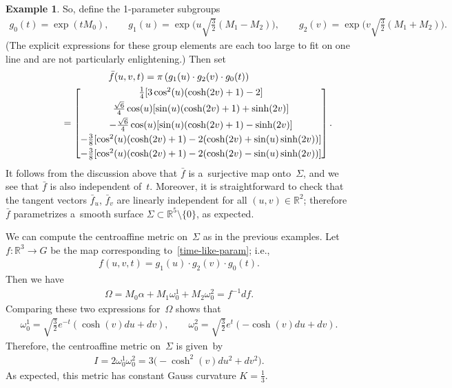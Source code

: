 \documentclass[pdftex]{sigma}
\numberwithin{equation}{section}
\theoremstyle{definition}
\newtheorem{exmpl}[teo]{Example}
\begin{document}
\begin{exmpl}
So, def\/ine the 1-parameter subgroups
\begin{gather*}
g_0(t) = \exp(tM_0),
\qquad\! \!
g_1(u) = \exp\Big(u \sqrt{\tfrac{3}{2}} (M_1 - M_2)\Big),
\qquad\! \!
g_2(v) = \exp\Big(v \sqrt{\tfrac{3}{2}} (M_1 + M_2)\Big).
\end{gather*}
(The explicit expressions for these group elements are each too large to f\/it on one line and are not particularly
enlightening.) Then set
\begin{gather}
\bar{f}(u,v,t)=\pi\left(g_1(u) \cdot g_2(v) \cdot g_0(t) \right)
\nonumber
\\
\phantom{\bar{f}(u,v,t)}
  =
\begin{bmatrix}
\frac{1}{4}[3 \cos^2(u)(\cosh(2v) + 1) - 2]
\vspace{1mm}\\
\frac{\sqrt{6}}{4} \cos(u) [\sin(u)(\cosh(2v) + 1) + \sinh(2v)]
\vspace{1mm}\\
-\frac{\sqrt{6}}{4} \cos(u) [\sin(u)(\cosh(2v) + 1) - \sinh(2v)]
\vspace{1mm}\\
-\frac{3}{8} [\cos^2(u)(\cosh(2v) + 1) - 2(\cosh(2v) + \sin(u) \sinh(2v))]
\vspace{1mm}\\
-\frac{3}{8} [\cos^2(u)(\cosh(2v) + 1) - 2(\cosh(2v) - \sin(u) \sinh(2v))]
\end{bmatrix}.
\label{time-like-param}
\end{gather}
It follows from the discussion above that $\bar{f}$ is a~surjective map onto~$\Sigma$, and we see that $\bar{f}$ is also
independent of~$t$.
Moreover, it is straightforward to check that the tangent vectors $\bar{f}_u$, $\bar{f}_v$ are linearly independent for
all $(u,v) \in \mathbb{R}^2$; therefore $\bar{f}$ parametrizes a~smooth surface $\Sigma \subset \mathbb{R}^5 \setminus
\{0 \}$, as expected.

We can compute the centroaf\/f\/ine metric on~$\Sigma$ as in the previous examples.
Let $f:\mathbb{R}^3 \to G$ be the map corresponding to~\eqref{time-like-param}; i.e.,
\begin{gather*}
f(u,v,t) = g_1(u) \cdot g_2(v) \cdot g_0(t).
\end{gather*}
Then we have
\begin{gather*}
\Omega = M_0  \alpha + M_1  \omega^1_0 + M_2  \omega^2_0 = f^{-1}  df.
\end{gather*}
Comparing these two expressions for~$\Omega$ shows that
\begin{gather*}
\omega^1_0 = \sqrt{\frac{3}{2}} e^{-t} \left(\cosh (v)  du + dv \right),
\qquad
\omega^2_0 = \sqrt{\frac{3}{2}} e^{t} \left(-\cosh (v)  du + dv \right).
\end{gather*}
Therefore, the centroaf\/f\/ine metric on~$\Sigma$ is given~by
\begin{gather*}
I = 2 \omega^1_0 \omega^2_0 = 3\big({-}\cosh^2(v)  du^2 + dv^2\big).
\end{gather*}
As expected, this metric has constant Gauss curvature $K = \frac{1}{3}$.


\end{exmpl}
\end{document}
